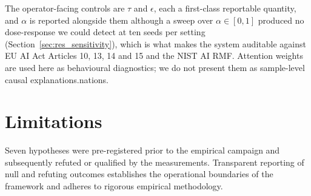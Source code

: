 \documentclass[preprint,12pt]{elsarticle}
\theoremstyle{plain}
\theoremstyle{definition}
\theoremstyle{remark}
\begin{document}
The operator-facing controls are $\tau$ and $\epsilon$, each a first-class reportable quantity, and $\alpha$ is reported alongside them although a sweep over $\alpha \in [0,1]$ produced no dose-response we could detect at ten seeds per setting (Section~\ref{sec:res_sensitivity}), which is what makes the system auditable against EU AI Act Articles 10, 13, 14 and 15 and the NIST AI RMF. Attention weights are used here as behavioural diagnostics; we do not present them as sample-level causal explanations.nations.

\section{Limitations}
\label{sec:limitations}

Seven hypotheses were pre-registered prior to the empirical campaign and subsequently refuted or qualified by the measurements. Transparent reporting of null and refuting outcomes establishes the operational boundaries of the framework and adheres to rigorous empirical methodology.
\end{document}
